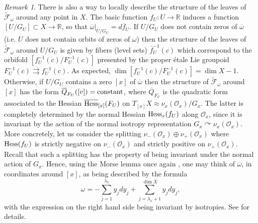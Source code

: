 \documentclass[
  a4paper, 
  reqno, 
  oneside, 
  12pt
]{amsart}
\theoremstyle{definition}
\theoremstyle{remark}
\newtheorem{remark}[theorem]{Remark}
\newcommand{\rr}{\rightrightarrows}
\begin{document}
\begin{remark}\label{RemakrStructure}
There is also a way to locally describe the structure of the leaves of $\tilde{\mathcal{F}}_\omega$ around any point in $X$. The basic function $f_U:U\to \mathbb{R}$ induces a function $[U/G_U]\subset X\to \mathbb{R}$, so that $\overline{\omega}|_{U/G_U}=\overline{df_U}$. If $U/G_U$ does not contain zeros of $\overline{\omega}$ (i.e. $U$ does not contain orbits of zeros of $\omega$) then the structure of the leaves of $\tilde{\mathcal{F}}_\omega$ around $U/G_U$ is given by fibers (level sets) $\overline{f}_U^{-1}(c)$ which correspond to the orbifold $[f_U^{-1}(c)/F_U^{-1}(c)]$ presented by the proper étale Lie groupoid $F_U^{-1}(c)\rr f_U^{-1}(c)$. As expected, $\dim [f_U^{-1}(c)/F_U^{-1}(c)]=\dim X-1$. Otherwise, if $U/G_U$ contains a zero $[x]$ of $\overline{\omega}$ then the structure of $\tilde{\mathcal{F}}_\omega$ around $[x]$ has the form $\overline{Q}_{F_U}([v])=\textnormal{constant}$, where $\overline{Q}_{F_U}$ is the quadratic form associated to the Hessian $\overline{\textnormal{Hess}}_{[x]}(F_U)$ on $T_{[x]}X\approx \nu_x(\mathcal{O}_x)/G_x$. The latter is completely determined by the normal Hessian $\textnormal{Hess}_x(f_U)$ along $\mathcal{O}_x$, since it is invariant by the action of the normal isotropy representation $G_x\curvearrowright \nu_x(\mathcal{O}_x)$. More concretely, let us consider the splitting $\nu_-(\mathcal{O}_x)\oplus \nu_+(\mathcal{O}_x)$ where $\textnormal{Hess}(f_U)$ is strictly negative on $\nu_-(\mathcal{O}_x)$ and strictly positive on $\nu_+(\mathcal{O}_x)$. Recall that such a splitting has the property of being invariant under the normal action of $G_x$. Hence, using the Morse lemma once again \cite{Hep,OV}, one may think of $\overline{\omega}$, in coordinates around $[x]$, as being described by the formula
$$\omega=-\sum_{j=1}^{\lambda_x} y_jdy_j+\sum_{j=\lambda_x+1}^{\dim X} y_jdy_j,$$
with the expression on the right hand side being invariant by isotropies. See \cite{OV} for details.
\end{remark}
\end{document}

